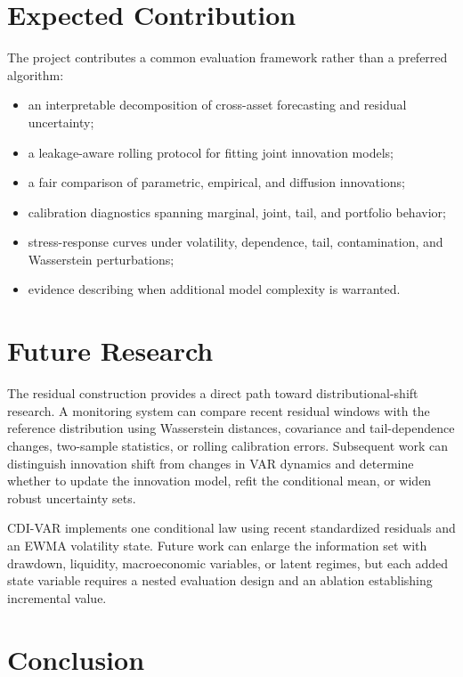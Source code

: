 \documentclass[11pt]{article}
\begin{document}
\section{Expected Contribution}

The project contributes a common evaluation framework rather than a preferred algorithm:

\begin{itemize}
    \item an interpretable decomposition of cross-asset forecasting and residual uncertainty;
    \item a leakage-aware rolling protocol for fitting joint innovation models;
    \item a fair comparison of parametric, empirical, and diffusion innovations;
    \item calibration diagnostics spanning marginal, joint, tail, and portfolio behavior;
    \item stress-response curves under volatility, dependence, tail, contamination, and Wasserstein perturbations;
    \item evidence describing when additional model complexity is warranted.
\end{itemize}

\section{Future Research}

The residual construction provides a direct path toward distributional-shift research. A monitoring system can compare recent residual windows with the reference distribution using Wasserstein distances, covariance and tail-dependence changes, two-sample statistics, or rolling calibration errors. Subsequent work can distinguish innovation shift from changes in VAR dynamics and determine whether to update the innovation model, refit the conditional mean, or widen robust uncertainty sets.

CDI-VAR implements one conditional law using recent standardized residuals and an EWMA volatility state. Future work can enlarge the information set with drawdown, liquidity, macroeconomic variables, or latent regimes, but each added state variable requires a nested evaluation design and an ablation establishing incremental value.

\section{Conclusion}
\end{document}
